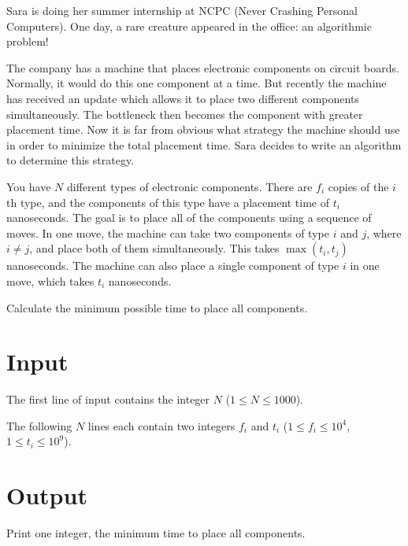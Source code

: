 
%

Sara is doing her summer internship at NCPC (Never Crashing Personal Computers). One day, a rare creature
appeared in the office: an algorithmic problem!

The company has a machine that places electronic components on circuit boards. Normally, it would 
do this one component at a time. But recently the machine has received an update which allows it 
to place two different components simultaneously. The bottleneck then becomes the component with greater placement time. 
Now it is far from obvious what strategy the machine should use in order to minimize the total placement
time. Sara decides to write an algorithm to determine this strategy. 

You have $N$ different types of electronic components. There are $f_i$ copies of the $i$th type, and 
the components of this type have a placement time of $t_i$ nanoseconds.
The goal is to place all of the components using a sequence of moves.
In one move, the machine can take two components of type $i$ and $j$, where $i \neq j$, and place 
both of them simultaneously. This takes $\max(t_i, t_j)$ nanoseconds. 
The machine can also place a single component of type $i$ in one move, which takes $t_i$ nanoseconds.

Calculate the minimum possible time to place all components.

\section*{Input}

The first line of input contains the integer $N$ ($1 \leq N \leq 1000$).

The following $N$ lines each contain two integers $f_i$ and $t_i$ ($1 \leq f_i \leq 10^4$, $1 \leq t_i \leq 10^9$).

\section*{Output}
Print one integer, the minimum time to place all components.
